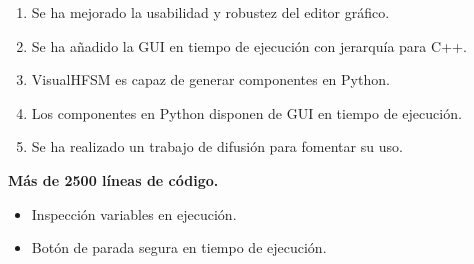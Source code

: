 \documentclass[notes,slidesec,a4]{seminar}
\begin{document}
\begin{hslide}

\begin{enumerate}
\item Se ha mejorado la usabilidad y robustez del editor gráfico.
\item Se ha añadido la GUI en tiempo de ejecución con jerarquía para C++.
\item VisualHFSM es capaz de generar componentes en Python.
\item Los componentes en Python disponen de GUI en tiempo de ejecución.
\item Se ha realizado un trabajo de difusión para fomentar su uso.
\end{enumerate}

\textbf{Más de 2500 líneas de código.}



\vspace{1cm}
\begin{itemize}
\item Inspección variables en ejecución.
\item Botón de parada segura en tiempo de ejecución.
\end{itemize}

\end{hslide}
\end{document}
